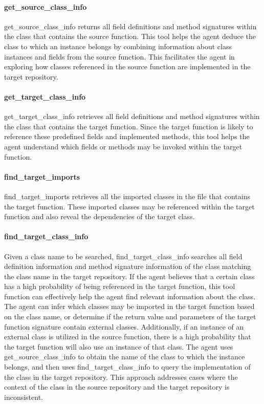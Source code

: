\paragraph{get\_source\_class\_info} 

get\_source\_class\_info returns all field definitions and method signatures within the class that contains the source function. This tool helps the agent deduce the class to which an instance belongs by combining information about class instances and fields from the source function. This facilitates the agent in exploring how classes referenced in the source function are implemented in the target repository.    

\paragraph{get\_target\_class\_info}

get\_target\_class\_info retrieves all field definitions and method signatures within the class that contains the target function. Since the target function is likely to reference these predefined fields and implemented methods, this tool helps the agent understand which fields or methods may be invoked within the target function.

\paragraph{find\_target\_imports} 

find\_target\_imports retrieves all the imported classes in the file that contains the target function. These imported classes may be referenced within the target function and also reveal the dependencies of the target class.

\paragraph{find\_target\_class\_info} 

Given a class name to be searched, find\_target\_class\_info searches all field definition information and method signature information of the class matching the class name in the target repository. If the agent believes that a certain class has a high probability of being referenced in the target function, this tool function can effectively help the agent find relevant information about the class. The agent can infer which classes may be imported in the target function based on the class name, or determine if the return value and parameters of the target function signature contain external classes. Additionally, if an instance of an external class is utilized in the source function, there is a high probability that the target function will also use an instance of that class. The agent uses get\_source\_class\_info to obtain the name of the class to which the instance belongs, and then uses find\_target\_class\_info to query the implementation of the class in the target repository. This approach addresses cases where the context of the class in the source repository and the target repository is inconsistent.

